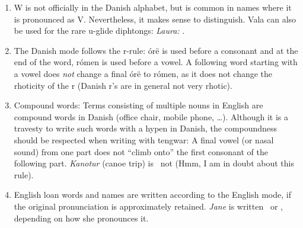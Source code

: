 \documentclass[a4paper]{article}
\begin{document}
\begin{enumerate}
  is completely silent.  No single tengwa is used here, as there is no
  mapping to similar words in other languages where a single tengwa
  would be used.  In the contrary, these words map almost one-to-one
  to Icelandic (close to Old Norse), where hj is pronounced as two
  joined consonant sounds (hard to pronounce for non-Icelanders).
  Presumably, Icelandic elves would write these words with hyarmen
  anna, which is shifted to halla anna in Danish to reflect that the H
  is silent.  Other words with silent h are also written with halla
  instead of hyarmen.\label{notehalla}
\item W is not officially in the Danish alphabet, but is common in
  names where it is pronounced as V.  Nevertheless, it makes sense to
  distinguish.  Vala can also be used for the rare u-glide diphtongs:
  \emph{Laura:} \Tlambe\Tvala\TTthreedots\Troomen\Ttelco\TTthreedots.\label{noteW}
\item The Danish mode follows the r-rule: \'or\"e is used before a
  consonant and at the end of the word, r\'omen is used before a
  vowel.  A following word starting with a vowel does \emph{not}
  change a final \'or\"e to r\'omen, as it does not change the
  rhoticity of the r (Danish r's are in general not very rhotic).\label{noteR}
\item Compound words: Terms consisting of multiple nouns in English
  are compound words in Danish (office chair, mobile phone, \ldots).
  Although it is a travesty to write such words with a hypen in
  Danish, the compoundness should be respected when writing with
  tengwar: A final vowel (or nasal sound) from one part does not
  ``climb onto'' the first consonant of the following part.
  \emph{Kanotur} (canoe trip) is
  \Tquesse\Tnuumen\TTthreedots\Ttelco\TTrightcurl
  \Ttinco\Toore\TTleftcurl ~not
  \Tquesse\Tnuumen\TTthreedots\Ttinco\TTrightcurl\Toore\TTleftcurl\Ts
  (Hmm, I am in doubt about this rule).
\item English loan words and names are written according to the
  English mode, if the original pronunciation is approximately
  retained.  \emph{Jane} is written
  \Tanga\Tnuumen\TTthreedots\TTdotbelow ~or
  \Tanna\Tnuumen\TTthreedots\Ttelco\TTacute, depending on how she
  pronounces it.
\end{enumerate}

\end{document}
